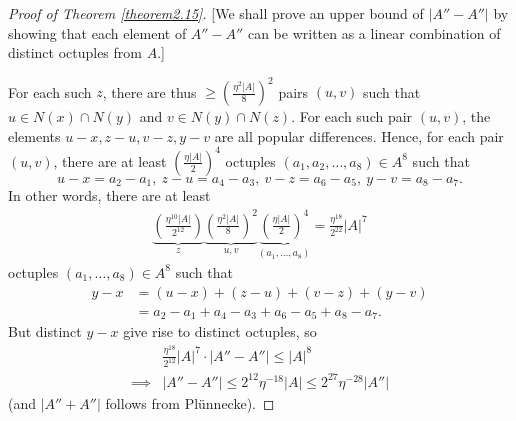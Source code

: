 \documentclass{article}
\theoremstyle{definition}
\begin{document}
\begin{proof}[Proof of Theorem \ref{theorem2.15}]
    [We shall prove an upper bound of $\left|A'' - A''\right|$ by showing that each element of $A''-A''$ can be written as a linear combination of distinct octuples from $A$.] 

    \vspace{1mm}
     
    For each such $z$, there are thus $\ge \left(\frac{\eta^2\left|A\right|}{8}\right)^2$ pairs $(u,v)$ such that $u \in N(x) \cap N(y)$ and $v \in N(y) \cap N(z)$. For each such pair $(u,v)$, the elements $u-x,z-u,v-z,y-v$ are all popular differences. Hence, for each pair $(u,v)$, there are at least $\left(\frac{\eta\left|A\right|}{2}\right)^4$ octuples $(a_1,a_2,\ldots,a_8) \in A^8$ such that \[
    u-x = a_2-a_1,~ z-u = a_4-a_3, ~ v-z = a_6 - a_5, ~ y-v = a_8-a_7.
    \]
    In other words, there are at least 
    \begin{align*}
        \underbrace{\left(\frac{\eta^{10}\left|A\right|}{2^{12}}\right)}_{z}\underbrace{\left(\frac{\eta^2 \left|A\right|}{8}\right)^2}_{u,v} \underbrace{\left(\frac{\eta \left|A\right|}{2}\right)^4}_{(a_1,\ldots,a_8)} = \frac{\eta^{18}}{2^{22}}\left|A\right|^7
    \end{align*}
    octuples $(a_1,\ldots,a_8) \in A^8$ such that 
    \begin{align*}
        y-x &= (u-x)  +(z-u) + (v-z) + (y-v) \\
        &= a_2-a_1 + a_4-a_3 + a_6-a_5 + a_8-a_7.
    \end{align*}
    But distinct $y-x$ give rise to distinct octuples, so 
    \begin{align*}
        &\frac{\eta^{18}}{2^{12}}\left|A\right|^7 \cdot \left|A''-A''\right| \le \left|A\right|^8 \\
        \implies& \left|A''-A''\right| \le 2^{12}\eta^{-18}\left|A\right| \le 2^{27}\eta^{-28}\left|A''\right| 
    \end{align*}
    (and $\left|A''+A''\right|$ follows from Plünnecke).
\end{proof}
\end{document}
